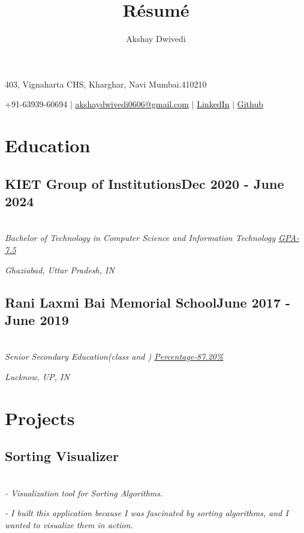 \documentclass[a4paper,11pt]{article}
\makeatletter
\renewcommand{\maketitle}{
\begin{center}
  {\Huge \bfseries \textrm{\theauthor}}

  403, Vignaharta CHS, Kharghar, Navi Mumbai.410210

  +91-63939-60694
  $|$
  \underline{akshaydwivedi0606@gmail.com}
  $|$
  \underline{\href{https://www.linkedin.com/in/akshaydwivedi10}{LinkedIn}}
  $|$
  \underline{\href{https://github.com/akshaynaresh}{Github}} 
\end{center}
}
\makeatother
\begin{document}
\title{R\'esum\'e}
\author{Akshay Dwivedi}
\maketitle
\thispagestyle{empty}
\section{Education}

\subsection{KIET Group of Institutions{\hspace{19.2em}}Dec 2020 - June 2024}

\textsl{\\{\hspace{0.5em}}Bachelor of Technology in Computer Science and Information Technology \underline{GPA-7.5}}

{\hspace{-1.5em}}\textsl{Ghaziabad, Uttar Pradesh, IN}


\subsection{Rani Laxmi Bai Memorial School{\hspace{16.3em}}June 2017 - June 2019}

\textsl{\\Senior Secondary Education(class  and ) \underline{Percentage-87.20\%}}

{\hspace{-1.5em}}\textsl{Lucknow, UP, IN}

\vspace{-1.1em}

\section{Projects}

\subsection{Sorting Visualizer}

\textsl{\\- Visualization tool for Sorting Algorithms.}

\hspace{-1.5em}\textsl{- I built this application because I was fascinated by sorting algorithms, and I wanted to visualize them in action.}
\end{document}
